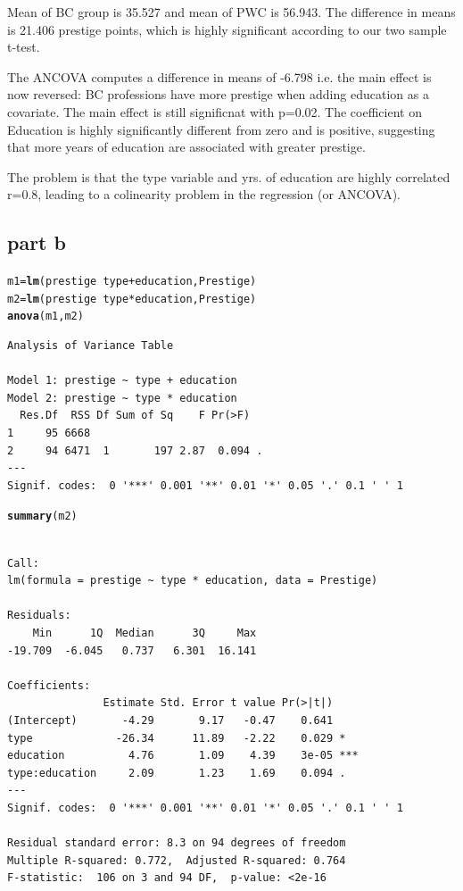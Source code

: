 \documentclass{article}\usepackage{graphicx, color}
\makeatletter
\newcommand{\hlfunctioncall}[1]{\textcolor[rgb]{0.501960784313725,0,0.329411764705882}{\textbf{#1}}}%
\newenvironment{kframe}{%
 \def\at@end@of@kframe{}%
 \ifinner\ifhmode%
  \def\at@end@of@kframe{\end{minipage}}%
  \begin{minipage}{\columnwidth}%
 \fi\fi%
 \def\FrameCommand##1{\hskip\@totalleftmargin \hskip-\fboxsep
 \colorbox{shadecolor}{##1}\hskip-\fboxsep
     \hskip-\linewidth \hskip-\@totalleftmargin \hskip\columnwidth}%
 \MakeFramed {\advance\hsize-\width
   \@totalleftmargin\z@ \linewidth\hsize
   \@setminipage}}%
 {\par\unskip\endMakeFramed%
 \at@end@of@kframe}
\newenvironment{knitrout}{}{} %
\makeatother
\begin{document}
Mean of BC group is 35.527 and mean of PWC is 56.943. The difference in means is 21.406 prestige points, which is highly significant according to our two sample t-test.

The ANCOVA computes a difference in means of -6.798 i.e. the main effect is now reversed: BC professions have more prestige when adding education as a covariate. The main effect is still significnat with p=0.02. The coefficient on Education is highly significantly different from zero and is positive, suggesting that more years of education are associated with greater prestige.

The problem is that the type variable and yrs. of education are highly correlated r=0.8, leading to a colinearity problem in the regression (or ANCOVA).

\subsection*{part b}
\begin{knitrout}
\color{fgcolor}\begin{kframe}
\begin{alltt}
m1=\hlfunctioncall{lm}(prestige~type+education, Prestige)
m2=\hlfunctioncall{lm}(prestige~type*education, Prestige)
\hlfunctioncall{anova}(m1,m2)
\end{alltt}
\begin{verbatim}
Analysis of Variance Table

Model 1: prestige ~ type + education
Model 2: prestige ~ type * education
  Res.Df  RSS Df Sum of Sq    F Pr(>F)  
1     95 6668                           
2     94 6471  1       197 2.87  0.094 .
---
Signif. codes:  0 '***' 0.001 '**' 0.01 '*' 0.05 '.' 0.1 ' ' 1 
\end{verbatim}
\begin{alltt}
\hlfunctioncall{summary}(m2)
\end{alltt}
\begin{verbatim}

Call:
lm(formula = prestige ~ type * education, data = Prestige)

Residuals:
    Min      1Q  Median      3Q     Max 
-19.709  -6.045   0.737   6.301  16.141 

Coefficients:
               Estimate Std. Error t value Pr(>|t|)    
(Intercept)       -4.29       9.17   -0.47    0.641    
type             -26.34      11.89   -2.22    0.029 *  
education          4.76       1.09    4.39    3e-05 ***
type:education     2.09       1.23    1.69    0.094 .  
---
Signif. codes:  0 '***' 0.001 '**' 0.01 '*' 0.05 '.' 0.1 ' ' 1 

Residual standard error: 8.3 on 94 degrees of freedom
Multiple R-squared: 0.772,	Adjusted R-squared: 0.764 
F-statistic:  106 on 3 and 94 DF,  p-value: <2e-16 

\end{verbatim}
\end{kframe}
\end{knitrout}
\end{document}

